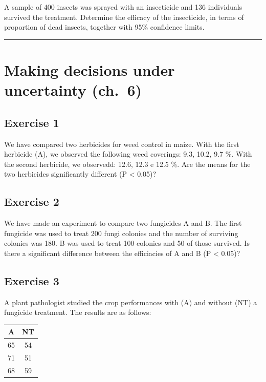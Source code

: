 \documentclass[a4paper,12pt,oneside]{book}
\begin{document}
A sample of 400 insects was sprayed with an insecticide and 136 individuals survived the treatment. Determine the efficacy of the insecticide, in terms of proportion of dead insects, together with 95\% confidence limits.

\begin{center}\rule{0.5\linewidth}{0.5pt}\end{center}

\hypertarget{making-decisions-under-uncertainty-ch.-6}{%
\section{Making decisions under uncertainty (ch.~6)}\label{making-decisions-under-uncertainty-ch.-6}}

\hypertarget{exercise-1-3}{%
\subsection{Exercise 1}\label{exercise-1-3}}

We have compared two herbicides for weed control in maize. With the first herbicide (A), we observed the following weed coverings: 9.3, 10.2, 9.7 \%. With the second herbicide, we observedd: 12.6, 12.3 e 12.5 \%. Are the means for the two herbicides significantly different (P \textless{} 0.05)?

\hypertarget{exercise-2-4}{%
\subsection{Exercise 2}\label{exercise-2-4}}

We have made an experiment to compare two fungicides A and B. The first fungicide was used to treat 200 fungi colonies and the number of surviving colonies was 180. B was used to treat 100 colonies and 50 of those survived. Is there a significant difference between the efficiacies of A and B (P \textless{} 0.05)?

\hypertarget{exercise-3-4}{%
\subsection{Exercise 3}\label{exercise-3-4}}

A plant pathologist studied the crop performances with (A) and without (NT) a fungicide treatment. The results are as follows:

\begin{longtable}[]{@{}cc@{}}
\toprule
A & NT \\
\midrule
\endhead
65 & 54 \\
71 & 51 \\
68 & 59 \\
\bottomrule
\end{longtable}
\end{document}
